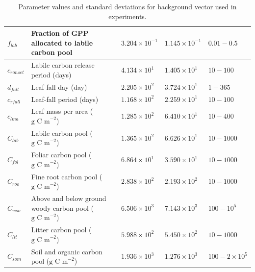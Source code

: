 \begin{table}[ht]
\begin{center}
\begin{tabular}{| l | p{4.5cm} | p{1.7cm} | p{1.7cm} | p{1.7cm} |}
$f_{lab}$ & Fraction of GPP allocated to labile carbon pool & $3.204\times 10^{-1}$ & $1.145\times 10^{-1}$ & $0.01 - 0.5$ \\ \hline
$c_{ronset}$ & Labile carbon release period (days) & $4.134\times 10^{1}$ & $1.405\times 10^{1}$ & $10 - 100$ \\ \hline
$d_{fall}$ & Leaf fall day (day) & $2.205\times 10^{2}$ & $3.724\times 10^{1}$ & $1 - 365$ \\ \hline
$c_{rfall}$ & Leaf-fall period (days) & $1.168\times 10^{2}$ & $2.259\times 10^{1}$ & $10 - 100$ \\ \hline
$c_{lma}$ & Leaf mass per area ($\text{g C m}^{-2}$) & $1.285\times 10^{2}$ & $6.410\times 10^{1}$ & $10 - 400$ \\ \hline
$C_{lab}$ & Labile carbon pool ($\text{g C m}^{-2}$) & $1.365\times 10^{2}$ & $6.626\times 10^{1}$ & $10 - 1000$ \\ \hline
$C_{fol}$ & Foliar carbon pool ($\text{g C m}^{-2}$) & $6.864\times 10^{1}$ & $3.590\times 10^{1}$ & $10 - 1000$ \\ \hline
$C_{roo}$ & Fine root carbon pool ($\text{g C m}^{-2}$) & $2.838\times 10^{2}$ & $2.193\times 10^{2}$ & $10 - 1000$ \\ \hline
$C_{woo}$ & Above and below ground woody carbon pool ($\text{g C m}^{-2}$) & $6.506\times 10^{3}$ & $7.143\times 10^{3}$ & $100 - 10^{5}$ \\ \hline
$C_{lit}$ & Litter carbon pool ($\text{g C m}^{-2}$) & $5.988\times 10^{2}$ & $5.450\times 10^{2}$ & $10 - 1000$ \\ \hline
$C_{som}$ & Soil and organic carbon pool ($\text{g C m}^{-2}$) & $1.936\times 10^{3}$ & $1.276\times 10^{3}$ & $100 - 2 \times 10^{5}$  \\ \hline
	\end{tabular}
	\caption{Parameter values and standard deviations for background vector used in experiments.}
	\label{chap6:table:xbvars}
\end{center} 
\end{table}

